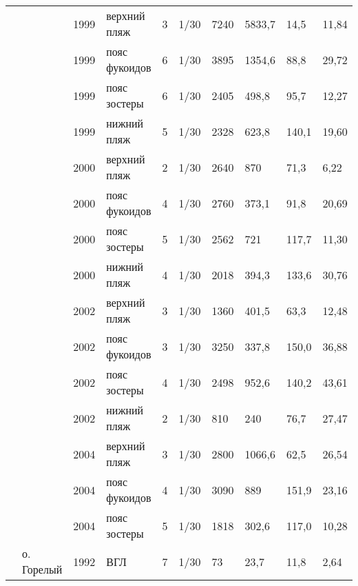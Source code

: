 \begin{footnotesize}
\begin{center}
\begin{longtable}{|p{1.6cm}|p{2.3cm}|p{0.8cm}|p{1.8cm}|p{1.1cm}|p{1.1cm}|*{4}{p{1cm}|}}
                   &                                & 1999 & верхний пляж      & 3    & 1/30 & 7240 & 5833,7 & 14,5  & 11,84 \\
                   &                                & 1999 & пояс фукоидов     & 6    & 1/30 & 3895 & 1354,6 & 88,8  & 29,72 \\
                   &                                & 1999 & пояс зостеры      & 6    & 1/30 & 2405 & 498,8  & 95,7  & 12,27 \\
                   &                                & 1999 & нижний пляж       & 5    & 1/30 & 2328 & 623,8  & 140,1 & 19,60 \\
                   &                                & 2000 & верхний пляж      & 2    & 1/30 & 2640 & 870    & 71,3  & 6,22  \\
                   &                                & 2000 & пояс фукоидов     & 4    & 1/30 & 2760 & 373,1  & 91,8  & 20,69 \\
                   &                                & 2000 & пояс зостеры      & 5    & 1/30 & 2562 & 721    & 117,7 & 11,30 \\
                   &                                & 2000 & нижний пляж       & 4    & 1/30 & 2018 & 394,3  & 133,6 & 30,76 \\
                   &                                & 2002 & верхний пляж      & 3    & 1/30 & 1360 & 401,5  & 63,3  & 12,48 \\
                   &                                & 2002 & пояс фукоидов     & 3    & 1/30 & 3250 & 337,8  & 150,0 & 36,88 \\
                   &                                & 2002 & пояс зостеры      & 4    & 1/30 & 2498 & 952,6  & 140,2 & 43,61 \\
                   &                                & 2002 & нижний пляж       & 2    & 1/30 & 810  & 240    & 76,7  & 27,47 \\
                   &                                & 2004 & верхний пляж      & 3    & 1/30 & 2800 & 1066,6 & 62,5  & 26,54 \\
                   &                                & 2004 & пояс фукоидов     & 4    & 1/30 & 3090 & 889    & 151,9 & 23,16 \\
                   &                                & 2004 & пояс зостеры      & 5    & 1/30 & 1818 & 302,6  & 117,0 & 10,28 \\\cline{2-10}
                   & о. Горелый                     & 1992 & ВГЛ               & 7    & 1/30 & 73   & 23,7   & 11,8  & 2,64  \\

\end{longtable}
\end{center}
\end{footnotesize}
